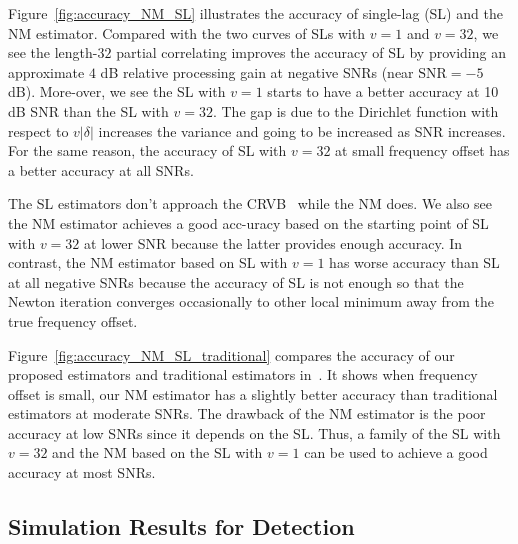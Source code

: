 Figure~\ref{fig:accuracy_NM_SL} illustrates the accuracy of single-lag (SL) and the NM estimator.
Compared with the two curves of SLs with $v{=}1$ and $v{=}32$, 
we see the length-$32$ partial correlating
improves the accuracy of SL by providing an approximate $4$ dB relative processing gain at negative SNRs (near $\text{SNR}=-5$ dB).
More-over, we see the SL with $v=1$ starts to have a better accuracy 
at 10 dB SNR than the SL with $v=32$. The gap is due to the Dirichlet function with
respect to $v|\delta|$ increases the variance and going to be increased as 
SNR increases.
For the same reason, the accuracy of SL with $v=32$ at small frequency offset has a better accuracy at all SNRs.

The SL estimators don't approach the CRVB~\cite{Gini_98} while the NM does. 
We also see the NM estimator achieves a good acc-uracy 
based on the starting point of SL with $v=32$ at lower SNR
because the latter provides enough accuracy. 
In contrast, the NM estimator based on SL with $v=1$ has worse accuracy than SL 
at all negative SNRs because the accuracy of SL is not enough so that the Newton iteration converges occasionally to 
other local minimum away from the true frequency offset.

Figure~\ref{fig:accuracy_NM_SL_traditional} compares the accuracy of our proposed estimators
and traditional estimators in~\cite{kay_89,Fitz_94,Luise_Reggiannini_95}. It shows when 
frequency offset is small, our NM estimator has a slightly better accuracy than traditional estimators at moderate SNRs.
The drawback of the NM estimator is the poor accuracy at low SNRs since it depends on the 
SL. Thus, a family of the SL with $v=32$ and the NM based on the SL with $v=1$ can be used 
to achieve a good accuracy at most SNRs.

\subsection{Simulation Results for Detection}



